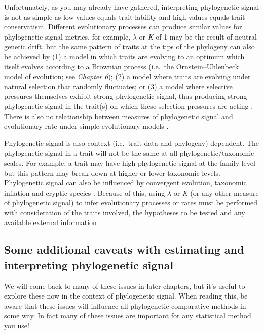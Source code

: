 \documentclass[]{book}
\begin{document}
Unfortunately, as you may already have gathered, interpreting
phylogenetic signal is not as simple as low values equals trait lability
and high values equals trait conservatism. Different evolutionary
processes can produce similar values for phylogenetic signal metrics,
for example, \(\lambda\) or \emph{K} of 1 may be the result of neutral
genetic drift, but the same pattern of traits at the tips of the
phylogeny can also be achieved by (1) a model in which traits are
evolving to an optimum which itself evolves according to a Brownian
process (i.e.~the Ornstein--Uhlenbeck model of evolution; see
\emph{Chapter 6}); (2) a model where traits are evolving under natural
selection that randomly fluctuates; or (3) a model where selective
pressures themselves exhibit strong phylogenetic signal, thus producing
strong phylogenetic signal in the trait(s) on which these selection
pressures are acting
\citep[hansen2008comparative]{revell2008phylogenetic}. There is also no
relationship between measures of phylogenetic signal and evolutionary
rate under simple evolutionary models \citep{revell2008phylogenetic}.

Phylogenetic signal is also context (i.e.~trait data and phylogeny)
dependent. The phylogenetic signal in a trait will not be the same at
all phylogenetic/taxonomic scales. For example, a trait may have high
phylogenetic signal at the family level but this pattern may break down
at higher or lower taxonomic levels. Phylogenetic signal can also be
influenced by convergent evolution, taxonomic inflation and cryptic
species \citep{losos2008phylogenetic}. Because of this, using
\(\lambda\) or \emph{K} (or any other measure of phylogenetic signal) to
infer evolutionary processes or rates must be performed with
consideration of the traits involved, the hypotheses to be tested and
any available external information
\citep[\citet{kamilar2013phylogenetic}]{cooper2010phylogenetic}.

\subsection{Some additional caveats with estimating and interpreting
phylogenetic
signal}\label{some-additional-caveats-with-estimating-and-interpreting-phylogenetic-signal}

We will come back to many of these issues in later chapters, but it's
useful to explore these now in the context of phylogenetic signal. When
reading this, be aware that these issues will influence all phylogenetic
comparative methods in some way. In fact many of these issues are
important for any statistical method you use!
\end{document}
